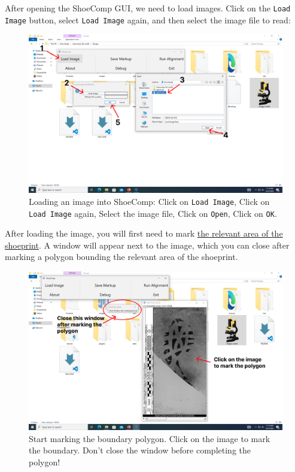 \documentclass[a4paper, oneside]{memoir}
\begin{document}
After opening the ShoeComp GUI, we need to load images. Click on the \texttt{Load Image}
button, select \texttt{Load Image} again, and then select the image file to read:

\begin{figure}[H]
\begin{center}
	\includegraphics[width=0.8\linewidth]{images/step_4a-anno.png}
\end{center}
\caption{Loading an image into ShoeComp: Click on \texttt{Load Image}, Click on
\texttt{Load Image} again, Select the image file, Click on \texttt{Open}, Click on \texttt{OK}.}
\label{fig:step4a}
\end{figure}

After loading the image, you will first need to mark \underline{the relevant area of the
shoeprint}. A window will appear next to the image, which you can close after marking a
polygon bounding the relevant area of the shoeprint.

\begin{figure}[H]
\begin{center}
	\includegraphics[width=0.8\linewidth]{images/step_4b-anno.png}
\end{center}
\caption{Start marking the boundary polygon. Click on the image to mark the boundary.
Don't close the window before completing the polygon!}
\label{fig:step4b}
\end{figure}
\end{document}
